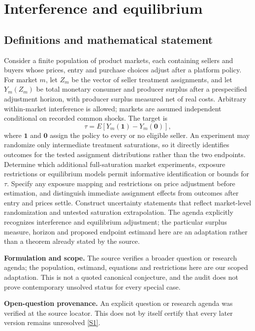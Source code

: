 \documentclass[11pt]{article}
\newcommand{\sref}[2]{\hyperlink{source:#1:#2}{[S#2]}}
\begin{document}
\section*{Interference and equilibrium}\label{30007703}
\subsection{Definitions and mathematical statement}
Consider a finite population of product markets, each containing sellers and buyers whose prices, entry and purchase choices adjust after a platform policy. For market \(m\), let \(Z_m\) be the vector of seller treatment assignments, and let \(Y_m(Z_m)\) be total monetary consumer and producer surplus after a prespecified adjustment horizon, with producer surplus measured net of real costs. Arbitrary within-market interference is allowed; markets are assumed independent conditional on recorded common shocks. The target is
\[
\tau=E[Y_m(\mathbf1)-Y_m(\mathbf0)],
\]
where \(\mathbf1\) and \(\mathbf0\) assign the policy to every or no eligible seller. An experiment may randomize only intermediate treatment saturations, so it directly identifies outcomes for the tested assignment distributions rather than the two endpoints. Determine which additional full-saturation market experiments, exposure restrictions or equilibrium models permit informative identification or bounds for \(\tau\). Specify any exposure mapping and restrictions on price adjustment before estimation, and distinguish immediate assignment effects from outcomes after entry and prices settle. Construct uncertainty statements that reflect market-level randomization and untested saturation extrapolation. The agenda explicitly recognizes interference and equilibrium adjustment; the particular surplus measure, horizon and proposed endpoint estimand here are an adaptation rather than a theorem already stated by the source.

\par\textbf{Formulation and scope.} The source verifies a broader question or research agenda; the population, estimand, equations and restrictions here are our scoped adaptation. This is not a quoted canonical conjecture, and the audit does not prove contemporary unsolved status for every special case.

\par\textbf{Open-question provenance.} An explicit question or research agenda was verified at the source locator. This does not by itself certify that every later version remains unresolved \sref{30007703}{1}.
\end{document}
